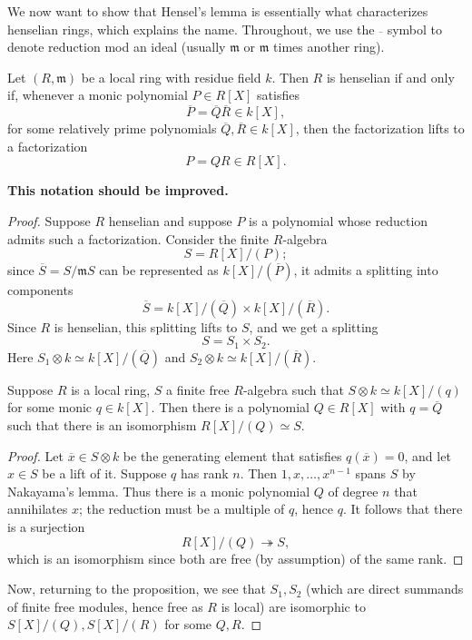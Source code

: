 We now want to show that Hensel's lemma is essentially what characterizes
henselian rings, which explains the name.
Throughout, we use the $\overline{}$ symbol to denote reduction mod an ideal
(usually $\mathfrak{m}$ or $\mathfrak{m}$ times another ring).

\begin{proposition} 
Let $(R, \mathfrak{m})$ be a local ring with residue field $k$. Then $R$ is henselian if and only if,
whenever a monic polynomial $P \in R[X]$ satisfies
\[ \overline{P} = \overline{Q}\overline{R} \in k[X], \]
for some relatively prime polynomials $\overline{Q}, \overline{R} \in k[X]$,
then the factorization lifts to a factorization 
\[ P = QR \in R[X].  \]
\end{proposition} 
\textbf{This notation should be improved.}
\begin{proof} 
Suppose $R$ henselian and suppose $P$ is a polynomial whose reduction admits
such a factorization.
Consider the finite $R$-algebra
\[ S = R[X]/(P);  \]
since $\overline{S } = S/\mathfrak{m}S $ can be represented as
$k[X]/(\overline{P})$, it admits a splitting into components
\[ \overline{S} = k[X]/(\overline{Q}) \times k[X]/(\overline{R}).  \]
Since $R$ is henselian, this splitting lifts to $S$, and we get a splitting
\[ S = S_1 \times S_2.  \]
Here $S_1 \otimes k \simeq k[X]/(\overline{Q})$ and $S_2 \otimes k \simeq
k[X]/(\overline{R})$. 

\begin{lemma} 
Suppose $R$ is a local ring, $S$ a finite free $R$-algebra such that $S \otimes k
\simeq k[X]/(q)$ for some monic $q \in k[X]$. Then there is a polynomial $Q \in
R[X]$ with $q = \overline{Q}$ such that there is an isomorphism $R[X]/(Q)
\simeq S$.
\end{lemma} 
\begin{proof} 
Let $\overline{x} \in S \otimes k$ be the generating element that satisfies
$q(\overline{x})=0$, and let $x \in S$ be a lift of it.  Suppose $q$ has
rank $n$. Then $1, x, \dots,
x^{n-1}$ spans $S$ by Nakayama's lemma. Thus there is a monic polynomial $Q$ of
degree $n$ that annihilates $x$; the reduction must be a multiple of $q$,
hence $q$. 
It follows that there is a surjection
\[ R[X]/(Q) \twoheadrightarrow S,  \]
which is an isomorphism since both are free (by assumption) of the same rank. 
\end{proof}


Now, returning to the proposition, we see that $S_1, S_2$ (which are direct
summands of finite free modules, hence free as $R$ is local) are isomorphic to
$S[X]/(Q), S[X]/(R)$ for some $Q, R$. 
\end{proof} 
